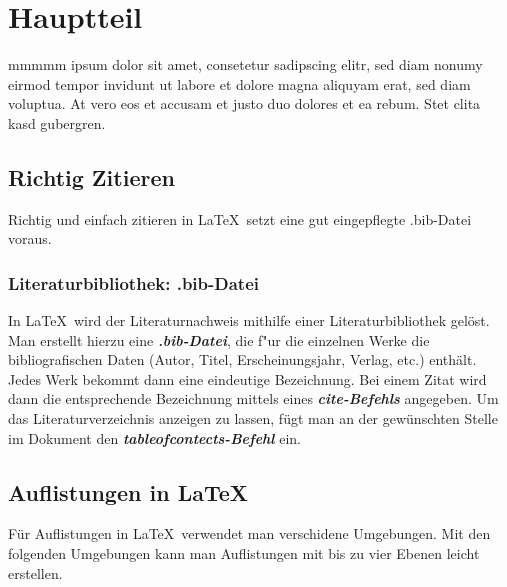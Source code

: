 \documentclass[12pt,a4paper]{article}
\begin{document}
\newpage
\section{Hauptteil}\label{body}
mmmmm ipsum dolor sit amet, consetetur sadipscing elitr, sed diam nonumy eirmod tempor invidunt ut labore et dolore magna aliquyam erat, sed diam voluptua. At vero eos et accusam et justo duo dolores et ea rebum. Stet clita kasd gubergren.

\subsection{Richtig Zitieren}
Richtig und einfach zitieren in \LaTeX\ setzt eine gut eingepflegte  .bib-Datei voraus.
\subsubsection {Literaturbibliothek: .bib-Datei }
In \LaTeX\ wird der Literaturnachweis mithilfe einer Literaturbibliothek gelöst. Man erstellt hierzu eine \textbf{\emph{.bib-Datei}}, die f"ur die einzelnen Werke die bibliografischen Daten (Autor, Titel, Erscheinungsjahr, Verlag, etc.) enthält. Jedes Werk bekommt dann eine eindeutige Bezeichnung. Bei einem Zitat wird dann die entsprechende Bezeichnung mittels eines \textbf{\emph{cite-Befehls}} angegeben. Um das Literaturverzeichnis anzeigen zu lassen, fügt man an der gewünschten Stelle im Dokument den \textbf{\emph{tableofcontects-Befehl}} ein.

\subsection{Auflistungen in \LaTeX}
Für Auflistungen in \LaTeX\ verwendet man verschidene Umgebungen. Mit den folgenden Umgebungen kann man Auflistungen mit bis zu vier Ebenen leicht erstellen.
\end{document}
